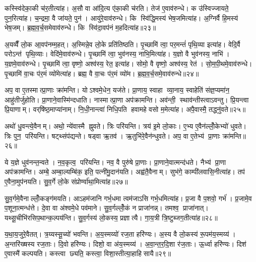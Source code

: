 कस्स्वि॑देका॒की च॑र॒तीत्या॑ह। अ॒सौ वा आ॑दि॒त्य ए॑का॒की च॑रति। तेज॑ ए॒वाव॑रुन्धे। क उ॑स्विज्जायते॒ पुन॒रित्या॑ह। च॒न्द्रमा॒ वै जा॑यते॒ पुन॑। आयु॑रे॒वाव॑रुन्धे। कि स्वि॑द्धि॒मस्य॑ भेष॒जमित्या॑ह। अ॒ग्निर्वै हि॒मस्य॑ भेष॒जम्। ब्र॒ह्म॒व॒र्च॒समेवाव॑रुन्धे। कि स्वि॑दा॒वप॑नं म॒हदित्या॑ह॥२३॥

अ॒यव्वैँ लो॒क आ॒वप॑नम्म॒हत्। अ॒स्मिन्ने॒व लो॒के प्रति॑तिष्ठति। पृ॒च्छामि॑ त्वा॒ पर॒मन्तं॑ पृथि॒व्या इत्या॑ह। वेदि॒र्वै परोऽन्त॑ पृथि॒व्याः। वेदि॑मे॒वाव॑रुन्धे। पृ॒च्छामि॑ त्वा॒ भुव॑नस्य॒ नाभि॒मित्या॑ह। य॒ज्ञो वै भुव॑नस्य॒ नाभि॑। य॒ज्ञमे॒वाव॑रुन्धे। पृ॒च्छामि॑ त्वा॒ वृष्णो॒ अश्व॑स्य॒ रेत॒ इत्या॑ह। सोमो॒ वै वृष्णो॒ अश्व॑स्य॒ रेत॑। सो॒म॒पी॒थमे॒वाव॑रुन्धे। पृ॒च्छामि॑ वा॒चः प॑र॒मं व्यो॑मेत्या॑ह। ब्रह्म॒ वै वा॒चः प॑र॒मं व्यो॑म। ब्र॒ह्म॒व॒र्च॒समे॒वाव॑रुन्धे॥२४॥\anuvakamend[होता॑ भवति॒ वै वृष्टि॑ पू॒र्वचि॑त्तिर॒न्नाद्य॑मे॒वाव॑रुन्धे म॒हदित्या॑ह॒ सोमो॒ वै वृष्णो॒ अश्व॑स्य॒ रेत॑श्च॒त्वारि॑ च]

अप॒ वा ए॒तस्मात्प्रा॒णाः क्रा॑मन्ति। योऽश्वमे॒धेन॒ यज॑ते। प्रा॒णाय॒ स्वाहा व्या॒नाय॒ स्वाहेति॑ संज्ञ॒प्यमा॑न॒ आहु॑तीर्जुहोति। प्रा॒णाने॒वास्मि॑न्दधाति। नास्मात्प्रा॒णा अप॑क्रामन्ति। अव॑न्ती॒ स्थाव॑न्तीस्त्वाऽवन्तु। प्रि॒यन्त्वा प्रि॒याणाम्। वर्‌षि॑ष्ठ॒माप्या॑नाम्। नि॒धी॒नान्त्वा॑ निधि॒पति हवामहे वसो म॒मेत्या॑ह। अपै॒वास्मै॒ तद्ध्नु॑वते॥२५॥

अथो॑ धु॒वन्त्ये॒वैनम्। अथो॒ न्ये॑वास्मै ह्नुवते। त्रिः परि॑यन्ति। त्रय॑ इ॒मे लो॒काः। ए॒भ्य ए॒वैन॑ल्लोँ॒केभ्यो॑ धुवते। त्रिः पुन॒ परि॑यन्ति। षट्थ्संप॑द्यन्ते। षड्वा ऋ॒तव॑। ऋ॒तुभि॑रे॒वैन॑न्धुवते। अप॒ वा ए॒तेभ्य॑ प्रा॒णाः क्रा॑मन्ति॥२६॥

ये य॒ज्ञे धुव॑नन्त॒न्वते। न॒व॒कृत्व॒ परि॑यन्ति। नव॒ वै पुरु॑षे प्रा॒णाः। प्रा॒णाने॒वात्मन्द॑धते। नैभ्य॑ प्रा॒णा अप॑क्रामन्ति। अम्बे॒ अम्बा॒ल्यम्बि॑क॒ इति॒ पत्नी॑मु॒दान॑यति। अह्व॑तै॒वैनाम्। सुभ॑गे॒ काम्पी॑लवासि॒नीत्या॑ह। तप॑ ए॒वैना॒मुप॑नयति। सु॒व॒र्गे लो॒के संप्रोर्ण्वा॑था॒मित्या॑ह॥२७॥

सु॒व॒र्गमे॒वैनाल्लोँ॒कङ्ग॑मयति। आऽहम॑जानि गर्भ॒धमा त्वम॑जाऽसि गर्भ॒धमित्या॑ह। प्र॒जा वै प॒शवो॒ गर्भ॑। प्र॒जामे॒व प॒शूना॒त्मन्ध॑त्ते। दे॒वा वा अ॑श्वमे॒धे पव॑माने। सु॒व॒र्गल्लोँ॒कं न प्राजा॑नन्न्। तमश्व॒ प्राजा॑नात्। यथ्सू॒चीभि॑रसिप॒थान्क॒ल्पय॑न्ति। सु॒व॒र्गस्य॑ लो॒कस्य॒ प्रज्ञात्यै। गा॒य॒त्री त्रि॒ष्टुब्जग॒तीत्या॑ह॥२८॥

य॒था॒य॒जुरे॒वैतत्। त्र॒य्यस्सू॒च्यो॑ भवन्ति। अ॒य॒स्मय्यो॑ रज॒ता हरि॑ण्यः। अ॒स्य वै लो॒कस्य॑ रू॒पम॑य॒स्मय्य॑। अ॒न्तरि॑ख्षस्य रज॒ताः। दि॒वो हरि॑ण्यः। दिशो॒ वा अ॑य॒स्मय्य॑। अ॒वा॒न्त॒र॒दि॒शा र॑ज॒ताः। ऊ॒र्ध्वा हरि॑ण्यः। दिश॑ ए॒वास्मै॑ कल्पयति। कस्त्वा छ्यति॒ कस्त्वा॒ विशा॒स्तीत्या॒हाहिसायै॥२९॥\anuvakamend[ह्नु॒व॒ते॒ क्रा॒म॒न्त्यू॒र्ण्वा॒था॒मित्या॑ह॒ जग॒तीत्या॑ह कल्पय॒त्येक॑ञ्च]

